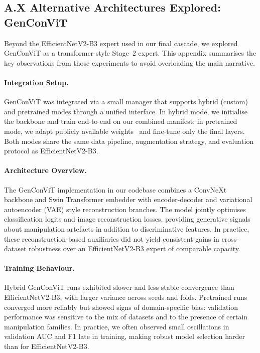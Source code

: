 
\subsection*{A.X Alternative Architectures Explored: GenConViT}

Beyond the EfficientNetV2\hyp B3 expert used in our final cascade, we explored GenConViT as a transformer\hyp style Stage~2 expert. This appendix summarises the key observations from those experiments to avoid overloading the main narrative.

\paragraph{Integration Setup.}
GenConViT was integrated via a small manager that supports hybrid (custom) and pretrained modes through a unified interface. In hybrid mode, we initialise the backbone and train end\hyp to\hyp end on our combined manifest; in pretrained mode, we adapt publicly available weights~\cite{genconvit_github} and fine\hyp tune only the final layers. Both modes share the same data pipeline, augmentation strategy, and evaluation protocol as EfficientNetV2\hyp B3.

\paragraph{Architecture Overview.}
The GenConViT implementation in our codebase combines a ConvNeXt backbone and Swin Transformer embedder with encoder\hyp decoder and variational autoencoder (VAE) style reconstruction branches. The model jointly optimises classification logits and image reconstruction losses, providing generative signals about manipulation artefacts in addition to discriminative features. In practice, these reconstruction\hyp based auxiliaries did not yield consistent gains in cross\hyp dataset robustness over an EfficientNetV2\hyp B3 expert of comparable capacity.

\paragraph{Training Behaviour.}
Hybrid GenConViT runs exhibited slower and less stable convergence than EfficientNetV2\hyp B3, with larger variance across seeds and folds. Pretrained runs converged more reliably but showed signs of domain\hyp specific bias: validation performance was sensitive to the mix of datasets and to the presence of certain manipulation families. In practice, we often observed small oscillations in validation AUC and F1 late in training, making robust model selection harder than for EfficientNetV2\hyp B3.

